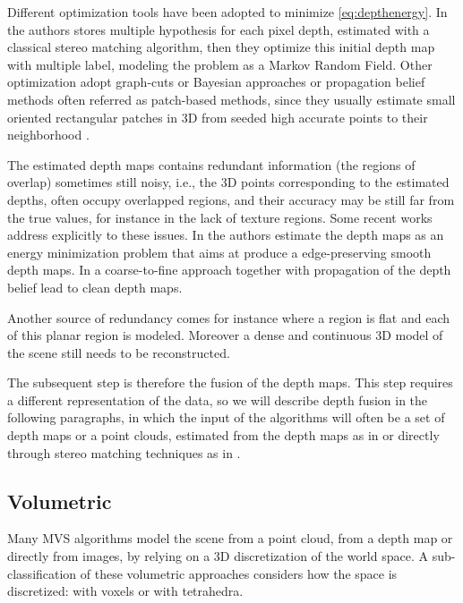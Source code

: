 Different optimization tools have been adopted to minimize \eqref{eq:depthenergy}. In \cite{campbell2008using} the authors stores multiple hypothesis for each pixel depth, estimated with a classical stereo matching algorithm, then they optimize this initial depth map with multiple label, modeling the problem as a Markov Random Field. Other optimization adopt graph-cuts \cite{kolmogorov2002multi} or Bayesian approaches \cite{strecha2006combined,gargallo2005bayesian} or propagation belief methods often referred as patch-based methods, since they usually estimate small oriented rectangular patches in 3D from seeded high accurate points to their neighborhood \cite{fu10,goesele2007multi,Tola12,bleyer2011patchmatch,heise2013pm}.




The estimated depth maps contains redundant information (the regions of overlap) sometimes still noisy, i.e., the 3D points corresponding to the estimated depths, often occupy overlapped regions, and their accuracy may be still far from the true values, for instance in the lack of texture regions.
Some recent works address explicitly to these issues. 
In \cite{semerjian2014new} the authors estimate the depth maps as an energy minimization problem that aims at produce a edge-preserving smooth depth maps.
In \cite{wei2014multi} a coarse-to-fine approach together with propagation of the depth belief lead to clean depth maps.

Another source of redundancy comes for instance where a region is flat and each of this planar region is modeled. Moreover a dense and continuous 3D model of the scene still needs to be reconstructed.

The subsequent step is therefore the fusion of the depth maps. This step requires a different representation of the data, so we will describe depth fusion in the following paragraphs, in which the input of the algorithms will often be a set of depth maps or a point clouds, estimated from the depth maps  as in \cite{curless1996volumetric} or directly through stereo matching techniques as in \cite{bradley2008accurate,labatut2007efficient,vu_et_al_2012}.


\subsection{Volumetric}
Many MVS algorithms model the scene from a point cloud, from a depth map or directly from images, by relying on a 3D discretization of the world space.
A sub-classification of these volumetric approaches considers how the space is discretized: with voxels or with tetrahedra.


